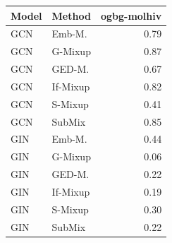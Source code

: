 
\begin{tabular}{llr}
\toprule
Model & Method & ogbg-molhiv\\
\midrule
GCN & Emb-M. & 0.79\\
GCN & G-Mixup & 0.87\\
GCN & GED-M. & 0.67\\
GCN & If-Mixup & 0.82\\
GCN & S-Mixup & 0.41\\
GCN & SubMix & 0.85\\
GIN & Emb-M. & 0.44\\
GIN & G-Mixup & 0.06\\
GIN & GED-M. & 0.22\\
GIN & If-Mixup & 0.19\\
GIN & S-Mixup & 0.30\\
GIN & SubMix & 0.22\\
\bottomrule
\end{tabular}

